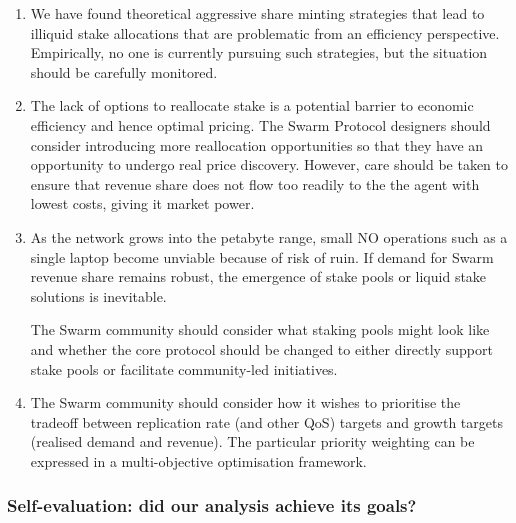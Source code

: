\begin{enumerate}
  \item
    We have found theoretical aggressive share minting strategies that lead to illiquid stake allocations that are problematic from an efficiency perspective.
    Empirically, no one is currently pursuing such strategies, but the situation should be carefully monitored.

  \item
    The lack of options to reallocate stake is a potential barrier to economic efficiency and hence optimal pricing.
    The Swarm Protocol designers should consider introducing more reallocation opportunities so that they have an opportunity to undergo real price discovery.
    However, care should be taken to ensure that revenue share does not flow too readily to the the agent with lowest costs, giving it market power.
    
  \item
    As the network grows into the petabyte range, small NO operations such as a single laptop become unviable because of risk of ruin.
    If demand for Swarm revenue share remains robust, the emergence of stake pools or liquid stake solutions is inevitable.

    The Swarm community should consider what staking pools might look like and whether the core protocol should be changed to either directly support stake pools or facilitate community-led initiatives.


  \item
    The Swarm community should consider how it wishes to prioritise the tradeoff between replication rate (and other QoS) targets and growth targets (realised demand and revenue).
    The particular priority weighting can be expressed in a multi-objective optimisation framework.

\end{enumerate}

\subsubsection{Self-evaluation: did our analysis achieve its goals?}

